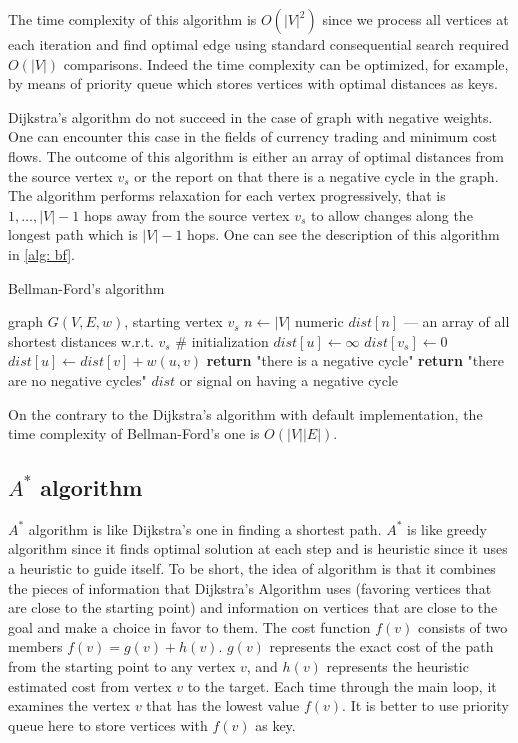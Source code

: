 \documentclass[12pt, bachelor, substylefile = algo_title.rtx]{disser}
\theoremstyle{definition}
\begin{document}
The time complexity of this algorithm is $O(|V|^2)$ since we process all vertices at each iteration and find optimal edge using standard consequential search required $O(|V|)$ comparisons. Indeed the time complexity can be optimized, for example, by means of priority queue which stores vertices with optimal distances as keys.


Dijkstra's algorithm do not succeed in the case of graph with negative weights. One can encounter this case in the fields of currency trading and minimum cost flows. The outcome of this algorithm is either an array of optimal distances from the source vertex $v_s$ or the report on that there is a negative cycle in the graph. The algorithm performs relaxation for each vertex
progressively, that is $1,\dots, |V|-1$ hops away from the source vertex $v_s$ to allow changes
along the longest path which is $|V|-1$ hops. One can see the description of this algorithm in \ref{alg: bf}.

\begin{algorithm}[!h]
\caption{Bellman-Ford's algorithm}
\label{alg: bf}
\begin{algorithmic}

\Require graph $G(V, E, w)$, starting vertex $v_s$
\State $n \gets |V|$
\State  numeric $dist[n]$ --- an array of all shortest distances w.r.t. $v_s$
\# initialization
	\State $dist[u] \gets \infty$
\EndFor
\State $dist[v_s] \gets 0$
			\State $dist[u] \gets dist[v] + w(u, v)$
		\EndIf
	\EndFor
\EndFor
{}
			\textbf{return} "there is a negative cycle"
		\EndIf
\EndFor
\textbf{return} "there are no negative cycles"
\Ensure $dist$ or signal on having a negative cycle
\end{algorithmic}
\end{algorithm}

On the contrary to the Dijkstra's algorithm with default implementation, the time complexity of Bellman-Ford's one is $O(|V||E|)$. 

\subsection{$A^*$ algorithm}
$A^*$ algorithm is like Dijkstra’s one in finding a shortest path. $A^*$ is like greedy algorithm since it finds optimal solution at each step and is heuristic since it uses a heuristic to guide itself. To be short, the idea of algorithm is that it combines the pieces of information that Dijkstra’s Algorithm uses (favoring vertices that are close to the starting point) and information on vertices that are close to the goal and make a choice in favor to them. The cost function $f(v)$ consists of two members $f(v) = g(v) + h(v)$. $g(v)$ represents the exact cost of the path from the starting point to any vertex $v$, and $h(v)$ represents the heuristic estimated cost from vertex $v$ to the target. Each time through the main loop, it examines the vertex $v$ that has the lowest value $f(v)$. It is better to use priority queue here to store vertices with $f(v)$ as key.
\end{document}
